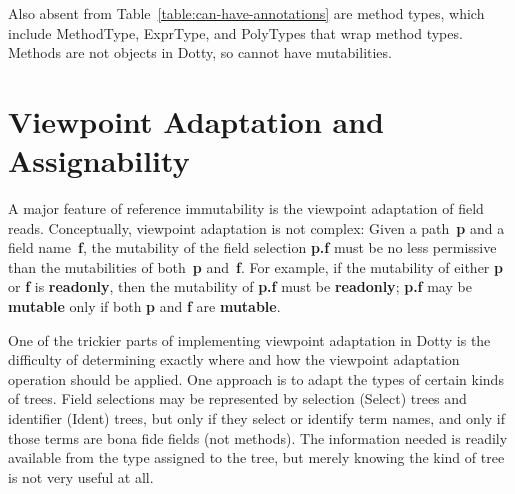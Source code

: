 \documentclass[11pt]{report}
\newcommand{\cdf}{\bf\ttfamily} %
\newcommand{\cd}{\cdf\small}  %
\begin{document}
Also absent from Table~\ref{table:can-have-annotations} are method types, which include MethodType, ExprType, and PolyTypes that wrap method types. Methods are not objects in Dotty, so cannot have mutabilities.







\section{Viewpoint Adaptation and Assignability} \label{sec:viewpoint-adaptation}

A major feature of reference immutability is the viewpoint adaptation of field reads.
Conceptually, viewpoint adaptation is not complex:
Given a path~{\cd p} and a field name~{\cd f}, the mutability of the field selection \mbox{\cd p.f} must be no less permissive than the mutabilities of
both~{\cd p} and~{\cd f}. For example, if the mutability of either {\cd p} or {\cd f} is {\cd readonly}, then the mutability of \mbox{\cd p.f}
must be {\cd readonly}; \mbox{\cd p.f} may be {\cd mutable} only if both {\cd p} and {\cd f} are {\cd mutable}.

One of the trickier parts of implementing viewpoint adaptation in Dotty is the difficulty of determining exactly where and how the viewpoint adaptation
operation should be applied. One approach is to adapt the types of certain kinds of trees. Field selections may be represented by selection (Select) trees and identifier (Ident) trees, but only if they select or identify term names, and only if those terms are bona fide fields (not methods). The information needed is readily available from the type assigned to the tree, but merely knowing the kind of tree is not very useful at all.
\end{document}
